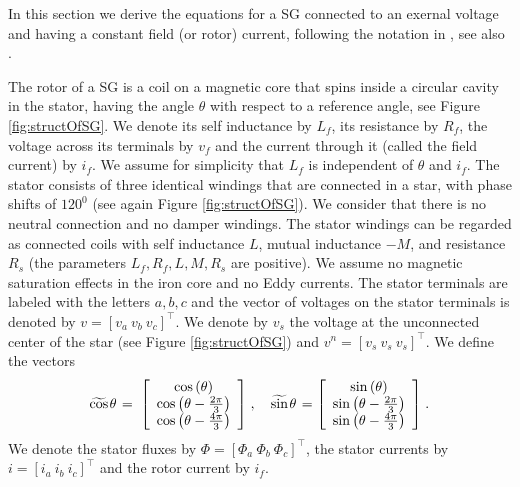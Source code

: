 \documentclass[letterpaper,10pt,conference]{ieeeconf}
\newcommand{\m}      {{\hbox{\hskip 1pt}}}
\begin{document}
In this section we derive the equations for a SG connected to an
exernal voltage and having a constant field (or rotor) current,
following the notation in \cite{ZhWe:11}, see also \cite{NaWe:15}.

The rotor of a SG is a coil on a magnetic core that spins inside a
circular cavity in the stator, having the angle $\theta$ with respect
to a reference angle, see Figure \ref{fig:structOfSG}. We denote its
self inductance by $L_f$, its resistance by $R_f$, the voltage across
its terminals by $v_f$ and the current through it (called the field
current) by $i_f$. We assume for simplicity that $L_f$ is independent
of $\theta$ and $i_f$. The stator consists of three identical windings
that are connected in a star, with phase shifts of $120^0$ (see again
Figure \ref{fig:structOfSG}). We consider that there is no neutral
connection and no damper windings. The stator windings can be regarded
as connected coils with self inductance $L$, mutual inductance $-M$,
and resistance $R_s$ (the parameters $L_f,R_f,L,M,R_s$ are
positive). We assume no magnetic saturation effects in the iron core
and no Eddy currents. The stator terminals are labeled with the
letters $a,b,c$ and the vector of voltages on the stator terminals is
denoted by $v=\left[v_a\ v_b\ v_c\right]^\top$. We denote by $v_s$ the
voltage at the unconnected center of the star (see Figure 
\ref{fig:structOfSG}) and
$v^n=[v_s\ v_s\ v_s]^\top$.  We define the vectors
$$ \widetilde{\cos}\m\theta \m=\m \left[\begin{array}{c} \cos\left(
   \theta\right)\\ \cos\left(\theta-\frac{2\pi}{3}\right)\\
   \cos\left(\theta-\frac{4\pi}{3}\right) \end{array}\right] \m,\quad
   \widetilde{\sin}\m\theta \m= \left[\begin{array}{c} \sin\left(
   \theta\right)\\ \sin\left(\theta-\frac{2\pi}{3}\right)\\ \sin\left
   (\theta-\frac{4\pi}{3}\right) \end{array}\right] \m.$$
We denote the stator fluxes by $\Phi=\left[\Phi_a\ \Phi_b\ \Phi_c
\right]^\top$, the stator currents by $i=\left[i_a\ i_b\ i_c\right]
^\top$ and the rotor current by $i_f$. 
\end{document}
